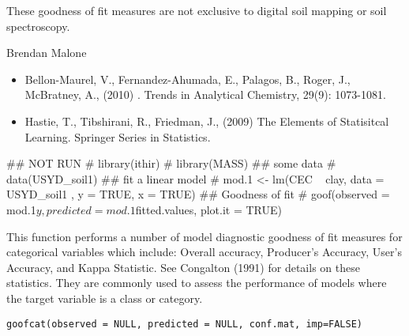 \documentclass[a4paper]{book}
\begin{document}
%
\begin{Note}
These goodness of fit measures are not exclusive to digital soil mapping or soil spectroscopy.
\end{Note}
%
\begin{Author}
Brendan Malone
\end{Author}
%
\begin{References}
\begin{itemize}

\item{} Bellon-Maurel, V., Fernandez-Ahumada, E., Palagos, B., Roger, J., McBratney, A., (2010) . Trends in Analytical Chemistry, 29(9): 1073-1081.
\item{} Hastie, T., Tibshirani, R., Friedman, J., (2009)  The Elements of Statisitcal Learning. Springer Series in Statistics.
\end{itemize}

\end{References}
%
\begin{Examples}
\begin{ExampleCode}

## NOT RUN
# library(ithir)
# library(MASS)
## some data
# data(USYD_soil1)
## fit a linear model
# mod.1 <- lm(CEC ~ clay, data = USYD_soil1 , y = TRUE, x = TRUE)
## Goodness of fit
# goof(observed = mod.1$y, predicted = mod.1$fitted.values, plot.it = TRUE)

\end{ExampleCode}
\end{Examples}
%
\begin{Description}
This function performs a number of model diagnostic goodness of fit measures for categorical variables which include: Overall accuracy, Producer's Accuracy, User's Accuracy, and Kappa Statistic. See Congalton (1991) for details on these statistics. They are commonly used to assess the performance of models where the target variable is a class or category.
\end{Description}
%
\begin{Usage}
\begin{verbatim}
goofcat(observed = NULL, predicted = NULL, conf.mat, imp=FALSE)
\end{verbatim}
\end{Usage}
\end{document}
